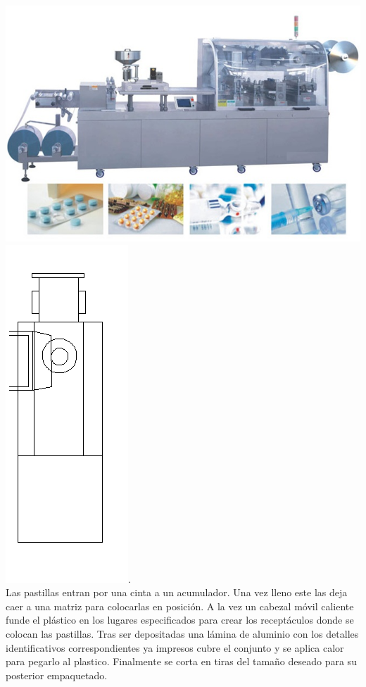 	\includegraphics[scale=0.4]{Datasheets/5Foto.png}\hfill
	\includegraphics[scale=0.4]{Datasheets/Miniaturas/blister.png}\hfill.\\

	Las pastillas entran por una cinta a un acumulador. Una vez lleno este las deja caer a una matriz para colocarlas en posición. A la vez un cabezal móvil caliente funde el plástico en los lugares especificados para crear los receptáculos donde se colocan las pastillas. Tras ser depositadas una lámina de aluminio con los detalles identificativos correspondientes ya impresos cubre el conjunto y se aplica calor para pegarlo al plastico. Finalmente se corta en tiras del tamaño deseado para su posterior empaquetado.\\

